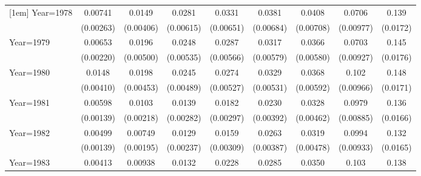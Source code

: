 \begin{table}[htbp]
\begin{tabular}{l*{8}{c}}
[1em]
Year=1978           &     0.00741\sym{***}&      0.0149\sym{***}&      0.0281\sym{***}&      0.0331\sym{***}&      0.0381\sym{***}&      0.0408\sym{***}&      0.0706\sym{***}&       0.139\sym{***}\\
                    &   (0.00263)         &   (0.00406)         &   (0.00615)         &   (0.00651)         &   (0.00684)         &   (0.00708)         &   (0.00977)         &    (0.0172)         \\
[1em]
Year=1979           &     0.00653\sym{***}&      0.0196\sym{***}&      0.0248\sym{***}&      0.0287\sym{***}&      0.0317\sym{***}&      0.0366\sym{***}&      0.0703\sym{***}&       0.145\sym{***}\\
                    &   (0.00220)         &   (0.00500)         &   (0.00535)         &   (0.00566)         &   (0.00579)         &   (0.00580)         &   (0.00927)         &    (0.0176)         \\
[1em]
Year=1980           &      0.0148\sym{***}&      0.0198\sym{***}&      0.0245\sym{***}&      0.0274\sym{***}&      0.0329\sym{***}&      0.0368\sym{***}&       0.102\sym{***}&       0.148\sym{***}\\
                    &   (0.00410)         &   (0.00453)         &   (0.00489)         &   (0.00527)         &   (0.00531)         &   (0.00592)         &   (0.00966)         &    (0.0171)         \\
[1em]
Year=1981           &     0.00598\sym{***}&      0.0103\sym{***}&      0.0139\sym{***}&      0.0182\sym{***}&      0.0230\sym{***}&      0.0328\sym{***}&      0.0979\sym{***}&       0.136\sym{***}\\
                    &   (0.00139)         &   (0.00218)         &   (0.00282)         &   (0.00297)         &   (0.00392)         &   (0.00462)         &   (0.00885)         &    (0.0166)         \\
[1em]
Year=1982           &     0.00499\sym{***}&     0.00749\sym{***}&      0.0129\sym{***}&      0.0159\sym{***}&      0.0263\sym{***}&      0.0319\sym{***}&      0.0994\sym{***}&       0.132\sym{***}\\
                    &   (0.00139)         &   (0.00195)         &   (0.00237)         &   (0.00309)         &   (0.00387)         &   (0.00478)         &   (0.00933)         &    (0.0165)         \\
[1em]
Year=1983           &     0.00413\sym{***}&     0.00938\sym{***}&      0.0132\sym{***}&      0.0228\sym{***}&      0.0285\sym{***}&      0.0350\sym{***}&       0.103\sym{***}&       0.138\sym{***}\\

\end{tabular}
\end{table}
